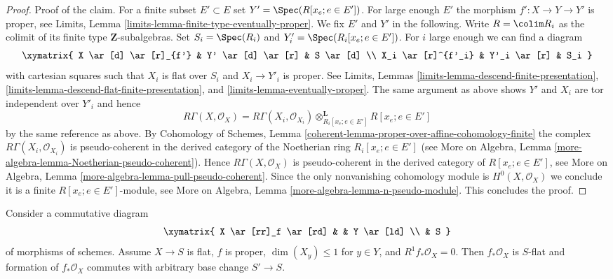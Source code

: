 \begin{proof}
\medskip\noindent
Proof of the claim.
For a finite subset $E' \subset E$ set $Y' = \Spec(R[x_e; e \in E'])$.
For large enough $E'$ the morphism $f' : X \to Y \to Y'$ is proper, see
Limits, Lemma \ref{limits-lemma-finite-type-eventually-proper}.
We fix $E'$ and $Y'$ in the following.
Write $R = \colim R_i$ as the colimit of its finite type
$\mathbf{Z}$-subalgebras. Set $S_i = \Spec(R_i)$
and $Y'_i = \Spec(R_i[x_e; e \in E'])$.
For $i$ large enough we can find a diagram
$$
\xymatrix{
X \ar[d] \ar[r]_{f'} & Y' \ar[d] \ar[r] & S \ar[d] \\
X_i \ar[r]^{f'_i} & Y'_i \ar[r] & S_i
}
$$
with cartesian squares such that $X_i$ is flat over $S_i$ and
$X_i \to Y'_i$ is proper. See
Limits, Lemmas \ref{limits-lemma-descend-finite-presentation},
\ref{limits-lemma-descend-flat-finite-presentation}, and
\ref{limits-lemma-eventually-proper}.
The same argument as above shows $Y'$ and $X_i$
are tor independent over $Y'_i$ and hence
$$
R\Gamma(X, \mathcal{O}_X) =
R\Gamma(X_i, \mathcal{O}_{X_i})
\otimes^\mathbf{L}_{R_i[x_e; e \in E']}
R[x_e; e \in E']
$$
by the same reference as above. By Cohomology of Schemes, Lemma
\ref{coherent-lemma-proper-over-affine-cohomology-finite}
the complex $R\Gamma(X_i, \mathcal{O}_{X_i})$ is pseudo-coherent
in the derived category of the Noetherian ring $R_i[x_e; e \in E']$ (see
More on Algebra, Lemma \ref{more-algebra-lemma-Noetherian-pseudo-coherent}).
Hence $R\Gamma(X, \mathcal{O}_X)$ is pseudo-coherent in the derived
category of $R[x_e; e \in E']$, see
More on Algebra, Lemma \ref{more-algebra-lemma-pull-pseudo-coherent}.
Since the only nonvanishing cohomology module
is $H^0(X, \mathcal{O}_X)$ we conclude it is a finite
$R[x_e; e \in E']$-module, see
More on Algebra, Lemma \ref{more-algebra-lemma-n-pseudo-module}.
This concludes the proof.
\end{proof}

\begin{lemma}
\label{lemma-h1-fibre-zero-h0-flat}
Consider a commutative diagram
$$
\xymatrix{
X \ar[rr]_f \ar[rd] & & Y \ar[ld] \\
& S
}
$$
of morphisms of schemes. Assume $X \to S$
is flat, $f$ is proper, $\dim(X_y) \leq 1$ for $y \in Y$, and
$R^1f_*\mathcal{O}_X = 0$. Then $f_*\mathcal{O}_X$
is $S$-flat and formation of $f_*\mathcal{O}_X$ commutes
with arbitrary base change $S' \to S$.
\end{lemma}

